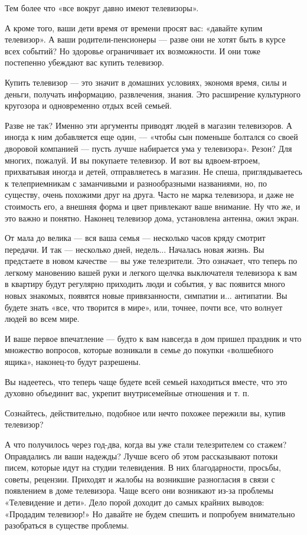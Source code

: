 \documentclass[12pt, a4paper, openany]{book}
\begin{document}
Тем более что «все вокруг давно имеют телевизоры». 

А кроме того, ваши дети время от времени просят вас: «давайте купим телевизор». А ваши родители-пенсионеры — разве они не хотят быть в курсе всех событий? Но здоровье ограничивает их возможности. И они тоже постепенно убеждают вас купить телевизор. 

Купить телевизор — это значит в домашних условиях, экономя время, силы и деньги, получать информацию, развлечения, знания. Это расширение культурного кругозора и одновременно отдых всей семьей. 

Разве не так? Именно эти аргументы приводят людей в магазин телевизоров. А иногда к ним добавляется еще один, — «чтобы сын поменьше болтался со своей дворовой компанией — пусть лучше набирается ума у телевизора». Резон? Для многих, пожалуй. И вы покупаете телевизор. И вот вы вдвоем-втроем, прихватывая иногда и детей, отправляетесь в магазин. Не спеша, приглядываетесь к телеприемникам с заманчивыми и разнообразными названиями, но, по существу, очень похожими друг на друга. Часто не марка телевизора, и даже не стоимость его, а внешняя форма и цвет привлекают ваше внимание. Ну что же, и это важно и понятно. Наконец телевизор дома, установлена антенна, ожил экран. 

От мала до велика — вся ваша семья — несколько часов кряду смотрит передачи. И так — несколько дней, недель... Началась новая жизнь. Вы предстаете в новом качестве — вы уже телезрители. Это означает, что теперь по легкому мановению вашей руки и легкого щелчка выключателя телевизора к вам в квартиру будут регулярно приходить люди и события, у вас появится много новых знакомых, появятся новые привязанности, симпатии и... антипатии. Вы будете знать «все, что творится в мире», или, точнее, почти все, что волнует людей во всем мире. 

И ваше первое впечатление — будто к вам навсегда в дом пришел праздник и что множество вопросов, которые возникали в семье до покупки «волшебного ящика», наконец-то будут разрешены. 

Вы надеетесь, что теперь чаще будете всей семьей находиться вместе, что это духовно объединит вас, укрепит внутрисемейные отношения и т. п. 

Сознайтесь, действительно, подобное или нечто похожее пережили вы, купив телевизор? 

А что получилось через год-два, когда вы уже стали телезрителем со стажем? Оправдались ли ваши надежды? Лучше всего об этом рассказывают потоки писем, которые идут на студии телевидения. В них благодарности, просьбы, советы, рецензии. Приходят и жалобы на возникшие разногласия в связи с появлением в доме телевизора. Чаще всего они возникают из-за проблемы «Телевидение и дети». Дело порой доходит до самых крайних выводов: «Продадим телевизор!» Но давайте не будем спешить и попробуем внимательно разобраться в существе проблемы. 
\end{document}
